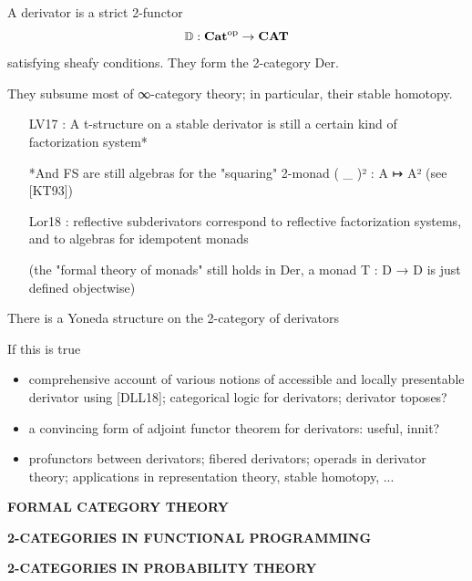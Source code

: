 \documentclass{beamer}
\begin{document}
\begin{frame}
  A derivator is a strict 2-functor
  \[\mathbb{D} : {\bf Cat}^\text{op} \to {\bf CAT} \]
  satisfying sheafy conditions. They form the 2-category Der.

  They subsume most of ∞-category theory; in particular, their stable homotopy.
  \begin{itemize}
    \item [LV17] : A t-structure on a stable derivator is still a certain kind of factorization system*

    *And FS are still algebras for the "squaring" 2-monad ( \_ )² : A ↦ A² (see [KT93])
    
    \item  [Lor18] : reflective subderivators correspond to reflective factorization systems, and to algebras for idempotent monads

    (the "formal theory of monads" still holds in Der, a monad T : D → D is just defined objectwise)
  \end{itemize}
\end{frame}
%
\begin{frame}
  There is a Yoneda structure on the 2-category of derivators

  If this is true
\begin{itemize}
\item comprehensive account of various notions of accessible and locally presentable derivator using [DLL18]; categorical logic for derivators; derivator toposes?
\item a convincing form of adjoint functor theorem for derivators: useful, innit?
\item profunctors between derivators; fibered derivators; operads in derivator theory; applications in representation theory, stable homotopy, ...
\end{itemize}
\end{frame}
%
%
%
%
%
\begin{frame}
  \Huge\centering \bfseries FORMAL CATEGORY THEORY
\end{frame}
%
\begin{frame}
  
\end{frame}
%
%
%
%
%
\begin{frame}
  \Huge\centering \bfseries 2-CATEGORIES IN FUNCTIONAL PROGRAMMING
\end{frame}
%
\begin{frame}
  
\end{frame}
%
%
%
%
%
\begin{frame}
  \Huge\centering \bfseries 2-CATEGORIES IN PROBABILITY THEORY
\end{frame}
%
\begin{frame}
  
\end{frame}
%
%
%
%
%
\end{document}
